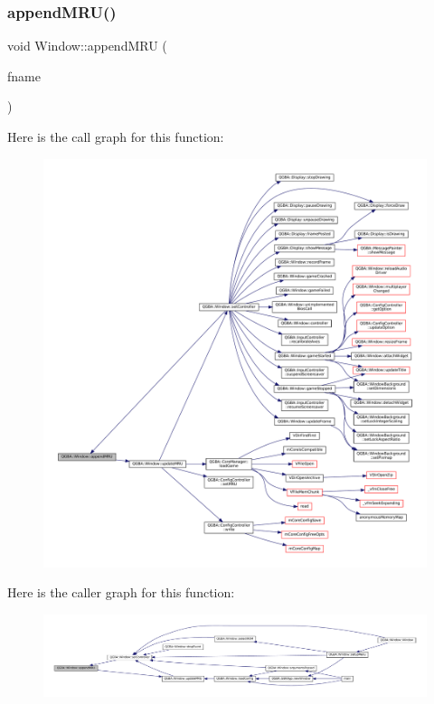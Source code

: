 \subsubsection{\texorpdfstring{append\+M\+R\+U()}{appendMRU()}}
{\footnotesize\ttfamily void Window\+::append\+M\+RU (\begin{DoxyParamCaption}\item[{const Q\+String \&}]{fname }\end{DoxyParamCaption})\hspace{0.3cm}{\ttfamily [private]}}

Here is the call graph for this function\+:
\nopagebreak
\begin{figure}[H]
\begin{center}
\leavevmode
\includegraphics[width=350pt]{class_q_g_b_a_1_1_window_af4bbf2742217f6075a7768fb3042ff31_cgraph}
\end{center}
\end{figure}
Here is the caller graph for this function\+:
\nopagebreak
\begin{figure}[H]
\begin{center}
\leavevmode
\includegraphics[width=350pt]{class_q_g_b_a_1_1_window_af4bbf2742217f6075a7768fb3042ff31_icgraph}
\end{center}
\end{figure}
\mbox{\label{class_q_g_b_a_1_1_window_a5015ae1d839b7d793a547c292df687b3}} 

